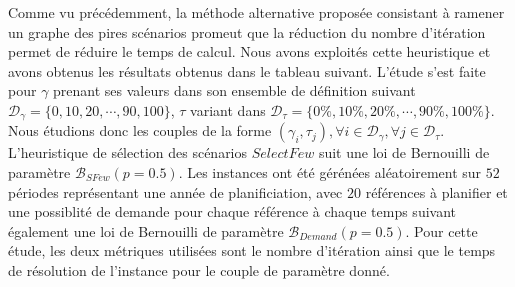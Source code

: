 \documentclass[12pt, a4paper, twoside]{report}
\numberwithin{equation}{section}
\begin{document}
	
	
	
	
	Comme vu précédemment, la méthode alternative proposée consistant à ramener un graphe des pires scénarios promeut que la réduction du nombre d'itération permet de réduire le temps de calcul. Nous avons exploités cette heuristique et avons obtenus les résultats obtenus dans le tableau suivant. L'étude s'est faite pour $\gamma$ prenant ses valeurs dans son ensemble de définition suivant $\mathcal{D}_{\gamma}=\{0, 10 ,20, \cdots, 90, 100\}$, $\tau$ variant dans $\mathcal{D}_{\tau}=\{0\%, 10\%, 20\%, \cdots, 90\%, 100\%\}$. Nous étudions donc les couples de la forme $(\gamma_i, \tau_j), \forall i\in\mathcal{D}_{\gamma}, \forall j\in\mathcal{D}_{\tau}$. L'heuristique de sélection des scénarios $SelectFew$ suit une loi de Bernouilli de paramètre $\mathcal{B}_{SFew}(p=0.5)$. Les instances ont été gérénées aléatoirement sur $52$ périodes représentant une année de planificiation, avec $20$ références à planifier et une possiblité de demande pour chaque référence à chaque temps suivant également une loi de Bernouilli de paramètre $\mathcal{B}_{Demand}(p=0.5)$. Pour cette étude, les deux métriques utilisées sont le nombre d'itération ainsi que le temps de résolution de l'instance pour le couple de paramètre donné.
	
\end{document}
